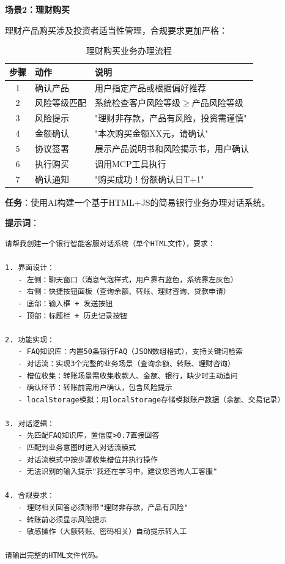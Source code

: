 \textbf{场景2：理财购买}

理财产品购买涉及投资者适当性管理，合规要求更加严格：

\begin{table}[H]
\centering
\small
\begin{tabular}{clp{6cm}}
\toprule
\textbf{步骤} & \textbf{动作} & \textbf{说明} \\
\midrule
1 & 确认产品 & 用户指定产品或根据偏好推荐 \\
2 & 风险等级匹配 & 系统检查客户风险等级$\geq$产品风险等级 \\
3 & 风险提示 & "理财非存款，产品有风险，投资需谨慎" \\
4 & 金额确认 & "本次购买金额XX元，请确认" \\
5 & 协议签署 & 展示产品说明书和风险揭示书，用户确认 \\
6 & 执行购买 & 调用MCP工具执行 \\
7 & 确认通知 & "购买成功！份额确认日T+1" \\
\bottomrule
\end{tabular}
\caption{理财购买业务办理流程}
\end{table}

\begin{practicebox}[用AI实现简易业务办理对话]
\textbf{任务}：使用AI构建一个基于HTML+JS的简易银行业务办理对话系统。

\textbf{提示词}：

\begin{lstlisting}
请帮我创建一个银行智能客服对话系统（单个HTML文件），要求：

1. 界面设计：
   - 左侧：聊天窗口（消息气泡样式，用户靠右蓝色，系统靠左灰色）
   - 右侧：快捷按钮面板（查询余额、转账、理财咨询、贷款申请）
   - 底部：输入框 + 发送按钮
   - 顶部：标题栏 + 历史记录按钮

2. 功能实现：
   - FAQ知识库：内置50条银行FAQ（JSON数组格式），支持关键词检索
   - 对话流：实现3个完整的业务场景（查询余额、转账、理财咨询）
   - 槽位收集：转账场景需收集收款人、金额、银行，缺少时主动追问
   - 确认环节：转账前需用户确认，包含风险提示
   - localStorage模拟：用localStorage存储模拟账户数据（余额、交易记录）

3. 对话逻辑：
   - 先匹配FAQ知识库，置信度>0.7直接回答
   - 匹配到业务意图时进入对话流模式
   - 对话流模式中按步骤收集槽位并执行操作
   - 无法识别的输入提示"我还在学习中，建议您咨询人工客服"

4. 合规要求：
   - 理财相关回答必须附带"理财非存款，产品有风险"
   - 转账前必须显示风险提示
   - 敏感操作（大额转账、密码相关）自动提示转人工

请输出完整的HTML文件代码。
\end{lstlisting}
\end{practicebox}

